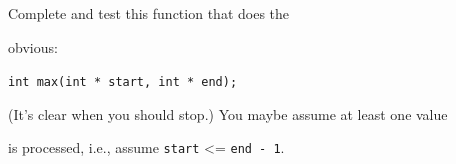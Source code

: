 Complete and test this function that does the

obvious:



\verb!int max(int * start, int * end);!



(It's clear when you should stop.) You maybe assume at least one value

is processed, i.e., assume \texttt{start} <= \texttt{end - 1}.

